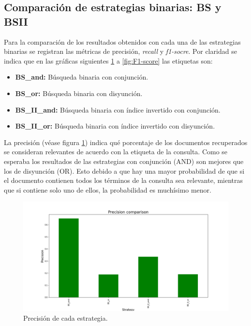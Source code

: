 \subsection{Comparación de estrategias binarias: BS y BSII}

Para la comparación de los resultados obtenidos con cada una de las estrategias binarias se registran las métricas de precisión, \textit{recall} y \textit{f1-socre}. Por claridad se indica que en las gráficas siguientes \ref{fig:Precision} a \ref{fig:F1-score} las etiquetas son:
\begin{itemize}
    \item \textbf{BS\_and:} Búsqueda binaria con conjunción.
    \item \textbf{BS\_or:} Búsqueda binaria con disyunción.
    \item \textbf{BS\_II\_and:} Búsqueda binaria con índice invertido con conjunción.
    \item \textbf{BS\_II\_or:} Búsqueda binaria con índice invertido con disyunción.
\end{itemize}

La precisión (véase figura \ref{fig:Precision}) indica qué porcentaje de los documentos recuperados se consideran relevantes de acuerdo con la etiqueta de la consulta. Como se esperaba los resultados de las estrategias con conjunción (AND) son mejores que los de disyunción (OR). Esto debido a que hay una mayor probabilidad de que si el documento contienen todos los términos de la consulta sea relevante, mientras que si contiene solo uno de ellos, la probabilidad es muchísimo menor.\\ 

\begin{figure}
    \centering
    \includegraphics[width=\textwidth]{results/images/BS_precision_comparison.png}
    \caption{Precisión de cada estrategia.}
    \label{fig:Precision}
\end{figure}

